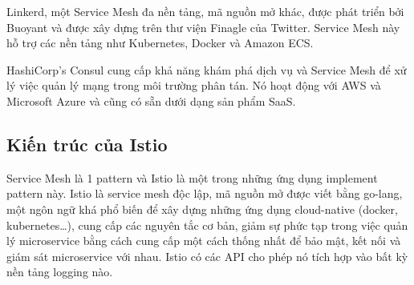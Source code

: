 \documentclass[14pt,a4paper]{book}
\begin{document}
		Linkerd, một Service Mesh đa nền tảng, mã nguồn mở khác, được phát triển bởi Buoyant và được xây dựng trên thư viện Finagle của Twitter. Service Mesh này hỗ trợ các nền tảng như Kubernetes, Docker và Amazon ECS.
		
		HashiCorp’s Consul cung cấp khả năng khám phá dịch vụ và Service Mesh để xử lý việc quản lý mạng trong môi trường phân tán. Nó hoạt động với AWS và Microsoft Azure và cũng có sẵn dưới dạng sản phẩm SaaS.
		\subsection{Kiến trúc của Istio}
		\hspace{0.6cm}Service Mesh là 1 pattern và Istio là một trong những ứng dụng implement pattern này. Istio là service mesh độc lập, mã nguồn mở được viết bằng go-lang, một ngôn ngữ khá phổ biến để xây dựng những ứng dụng cloud-native (docker, kubernetes…), cung cấp các nguyên tắc cơ bản, giảm sự phức tạp trong việc quản lý microservice bằng cách cung cấp một cách thống nhất để bảo mật, kết nối và giám sát microservice với nhau. Istio có các API cho phép nó tích hợp vào bất kỳ nền tảng logging nào.
		
\end{document}
